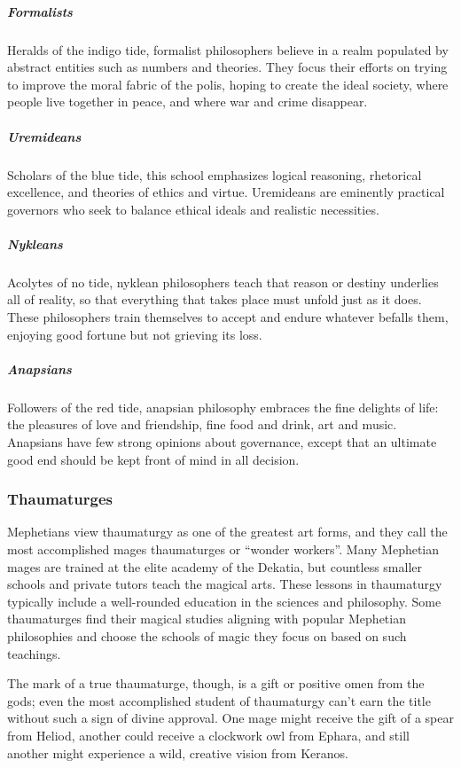         \subparagraph{Formalists} Heralds of the indigo tide, formalist philosophers believe in a realm populated by abstract entities such as numbers and theories.
        They focus their efforts on trying to improve the moral fabric of the polis, hoping to create the ideal society, where people live together in peace, and where war and crime disappear.

        \subparagraph{Uremideans} Scholars of the blue tide, this school emphasizes logical reasoning, rhetorical excellence, and theories of ethics and virtue.
        Uremideans are eminently practical governors who seek to balance ethical ideals and realistic necessities.

        \subparagraph{Nykleans} Acolytes of no tide, nyklean philosophers teach that reason or destiny underlies all of reality, so that everything that takes place must unfold just as it does.
        These philosophers train themselves to accept and endure whatever befalls them, enjoying good fortune but not grieving its loss.

        \subparagraph{Anapsians} Followers of the red tide, anapsian philosophy embraces the fine delights of life: the pleasures of love and friendship, fine food and drink, art and music.
        Anapsians have few strong opinions about governance, except that an ultimate good end should be kept front of mind in all decision.

    \subsubsection{Thaumaturges}
        Mephetians view thaumaturgy as one of the greatest art forms, and they call the most accomplished mages thaumaturges or ``wonder workers''.
        Many Mephetian mages are trained at the elite academy of the Dekatia, but countless smaller schools and private tutors teach the magical arts.
        These lessons in thaumaturgy typically include a well-rounded education in the sciences and philosophy.
        Some thaumaturges find their magical studies aligning with popular Mephetian philosophies and choose the schools of magic they focus on based on such teachings.

        The mark of a true thaumaturge, though, is a gift or positive omen from the gods; even the most accomplished student of thaumaturgy can't earn the title without such a sign of divine approval.
        One mage might receive the gift of a spear from Heliod, another could receive a clockwork owl from Ephara, and still another might experience a wild, creative vision from Keranos.

